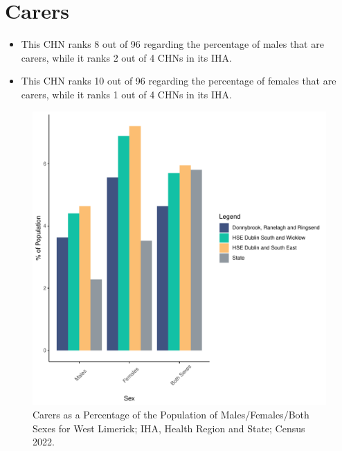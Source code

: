 \documentclass{article}
\begin{document}
\section{Carers}\label{sect:Carers}
\begin{itemize}
\item This CHN ranks  8 out of 96 regarding the percentage of males that are carers, while it ranks   2 out of 4 CHNs in its IHA.
\item This CHN ranks  10 out of 96 regarding the percentage of females that are carers, while it ranks   1 out of 4 CHNs in its IHA.
\end{itemize}
\begin{figure}[H]
	\centering
	\includegraphics[width = 150mm]{../figures/CareED.pdf}
	\caption{Carers as a Percentage of the Population of Males/Females/Both Sexes for West Limerick; IHA, Health Region and State; Census 2022.}
	\label{fig:2ae19629-1a6a-13a3-e055-000000000001}
	\end{figure}
\end{document}
